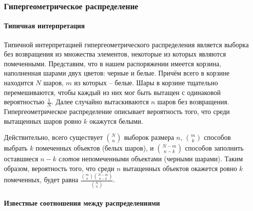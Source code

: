 \documentclass[
  russian,
  a4paper,
]{article}
\let\oldparagraph\paragraph
\renewcommand{\paragraph}[1]{\oldparagraph{#1}\mbox{}}
\begin{document}
\hypertarget{ux433ux438ux43fux435ux440ux433ux435ux43eux43cux435ux442ux440ux438ux447ux435ux441ux43aux43eux435-ux440ux430ux441ux43fux440ux435ux434ux435ux43bux435ux43dux438ux435-1}{%
\subsubsection{Гипергеометрическое
распределение}\label{ux433ux438ux43fux435ux440ux433ux435ux43eux43cux435ux442ux440ux438ux447ux435ux441ux43aux43eux435-ux440ux430ux441ux43fux440ux435ux434ux435ux43bux435ux43dux438ux435-1}}

\hypertarget{ux442ux438ux43fux438ux447ux43dux430ux44f-ux438ux43dux442ux435ux440ux43fux440ux435ux442ux430ux446ux438ux44f}{%
\paragraph{Типичная
интерпретация}\label{ux442ux438ux43fux438ux447ux43dux430ux44f-ux438ux43dux442ux435ux440ux43fux440ux435ux442ux430ux446ux438ux44f}}

Типичной интерпретацией гипергеометрического распределения является
выборка без возвращения из множества элементов, некоторые из которых
являются помеченными. Представим, что в нашем распоряжении имеется
корзина, наполненная шарами двух цветов: черные и белые. Причём всего в
корзине находится \(N\) шаров, \(m\) из которых -- белые. Шары в корзине
тщательно перемешиваются, чтобы каждый из них мог быть вытащен с
одинаковой вероятностью \(\frac{1}{N}\). Далее случайно вытаскиваются
\(n\) шаров без возвращения. Гипергеометрическое распределение описывает
вероятность того, что среди вытащенных шаров ровно \(k\) окажутся
белыми.

Действительно, всего существует \(\binom{N}{n}\) выборок размера \(n\),
\(\binom{m}{k}\) способов выбрать \(k\) помеченных объектов (белых
шаров), и \(\binom{N-m}{n-k}\) способов заполнить оставшиеся \(n-k\)
\emph{слотов} непомеченными объектами (черными шарами). Таким образом,
вероятность того, что среди \(n\) вытащенных объектов окажется ровно
\(k\) помеченных, будет равна
\(\frac{\binom{m}{k}\binom{N-m}{n-k}}{\binom{N}{n}}\).

\hypertarget{ux438ux437ux432ux435ux441ux442ux43dux44bux435-ux441ux43eux43eux442ux43dux43eux448ux435ux43dux438ux44f-ux43cux435ux436ux434ux443-ux440ux430ux441ux43fux440ux435ux434ux435ux43bux435ux43dux438ux44fux43cux438}{%
\paragraph{Известные соотношения между
распределениями}\label{ux438ux437ux432ux435ux441ux442ux43dux44bux435-ux441ux43eux43eux442ux43dux43eux448ux435ux43dux438ux44f-ux43cux435ux436ux434ux443-ux440ux430ux441ux43fux440ux435ux434ux435ux43bux435ux43dux438ux44fux43cux438}}
\end{document}
